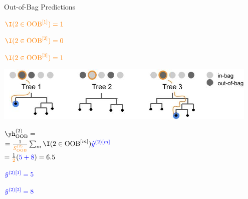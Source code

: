 \documentclass[11pt,compress,t,notes=noshow, xcolor=table]{beamer}
\begin{document}
\begin{vbframe}{Out-of-Bag Predictions}
\begin{minipage}[b]{0.19\textwidth}
  \tiny
  $\textcolor{orange}{\I(2 \in \text{OOB}^{[1]}) = 1}$
\end{minipage}
\begin{minipage}[b]{0.19\textwidth}
  \tiny
  $\textcolor{orange}{\I(2 \in \text{OOB}^{[2]}) = 0}$
\end{minipage}
\begin{minipage}[b]{0.19\textwidth}
  \tiny
  $\textcolor{orange}{\I(2 \in \text{OOB}^{[3]}) = 1}$
\end{minipage}
\begin{minipage}{0.7\textwidth}
  \includegraphics[width = 0.95\textwidth]{figure_man/forests-oob-pred.jpg}
\end{minipage}%
\begin{minipage}{0.3\textwidth}
  \tiny
  $\yh^{(2)}_{\text{OOB}} = $ \\ 
  $= \frac{1}{\textcolor{orange}{S_{\text{OOB}}^{(2)}}} 
  \sum_{m} \I(2 \in \text{OOB}^{[m]}) \textcolor{blue}{\hat{y}^{(2)[m]}}$ \\
  $= \frac{1}{\textcolor{orange}{2}} (\textcolor{blue}{5 + 8}) = 6.5$
\end{minipage}
\vspace{-0.2cm}
\begin{minipage}[b]{0.19\textwidth}
  \tiny
  $\textcolor{blue}{\hat{y}^{(2)[1]} = 5}$
\end{minipage}
\begin{minipage}[b]{0.19\textwidth}
  \tiny
  \phantom{foo}
\end{minipage}
\begin{minipage}[b]{0.19\textwidth}
  \tiny
  $\textcolor{blue}{\hat{y}^{(2)[3]} = 8}$
\end{minipage}

\vspace{0.2cm}
\tiny

\end{vbframe}
\end{document}
